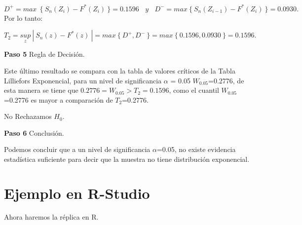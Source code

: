 \documentclass[
  a4paper,
  oneside,
  openany]{book}
\begin{document}
\[ D^+= max \ \  \{\ S_{n}(Z_{i})-F^*(Z_{i}) \ \}= 0.1596 \ \ \ \ y\ \ \ \ D^-= max\  \{ \ S_{n}(Z_{i-1})-F^*(Z_{i}) \ \}=0.0930. \]
Por lo tanto:

\[T_{2}=\underset{z}{sup}\ | \ S_{n}(z)-F^*(z) \ |=max \ \{\ D^+,D^- \ \}=max \ \{ \ 0.1596,0.0930 \ \}=0.1596.\]

\textbf{Paso 5} Regla de Decisión.

Este último resultado se compara con la tabla de valores críticos de la Tabla Lilliefors Exponencial, para un nivel de significancia \(\alpha\) = 0.05 \(W_{0.05}\)=0.2776, de esta manera se tiene que \(0.2776 = W_{0.05} > T_{2} = 0.1596\), como el cuantil \(W_{0.05}\)=0.2776 es mayor a comparación de \(T_{2}\)=0.2776.

No Rechazamos \(H_0\).

\textbf{Paso 6} Conclusión.

Podemos concluir que a un nivel de significancia \(\alpha\)=0.05, no existe evidencia estadística suficiente para decir que la muestra no tiene distribución exponencial.

\hypertarget{ejemplo-en-r-studio-16}{%
\section{Ejemplo en R-Studio}\label{ejemplo-en-r-studio-16}}

Ahora haremos la réplica en R.
\end{document}
